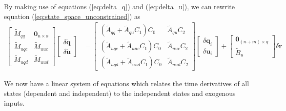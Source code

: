 \documentclass{svjour3}                     %
\begin{document}
By making use of equations (\ref{eq:delta_q}) and (\ref{eq:delta_u}), we can
rewrite equation (\ref{eq:state_space_unconstrained}) as
\begin{align}
  \label{eq:state_space_constrained}
  \left[
    \begin{array}{cc}
      \tilde{M}_{qq} & \bm{0}_{n \times o} \\
      \tilde{M}_{uqc} & \tilde{M}_{uuc} \\
      \tilde{M}_{uqd} & \tilde{M}_{uud}
    \end{array}
    \right]
    \left[
      \begin{array}{c}
        \delta \bm{\dot{q}} \\
        \delta \bm{\dot{u}}
      \end{array}
    \right]
   &=
   \left[
     \begin{array}{cc}
       (\tilde{A}_{qq} + \tilde{A}_{qu} C_1 ) C_0 & \tilde{A}_{qu} C_2 \\
       (\tilde{A}_{uqc} + \tilde{A}_{uuc} C_1 ) C_0 & \tilde{A}_{uuc} C_2\\
       (\tilde{A}_{uqd} + \tilde{A}_{uud} C_1 ) C_0 & \tilde{A}_{uud} C_2
     \end{array}
   \right]
    \left[
      \begin{array}{c}
        \delta \bm{q}_i \\
        \delta \bm{u}_i
      \end{array}
    \right]
    +
    \left[
      \begin{array}{c}
        \bm{0}_{(n+m) \times q} \\
        \tilde{B}_{u}
      \end{array}
    \right]
    \delta \bm{r}
\end{align}

We now have a linear system of equations which relates the time derivatives of all
states (dependent and independent) to the independent states and exogenous inputs.
\end{document}

